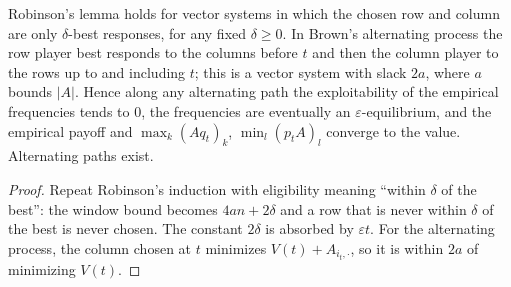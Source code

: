 \begin{theorem}
\label{thm:beh-alt-fp}
\leanok
Robinson's lemma holds for vector systems in which the chosen row and column are only $\delta$-best responses, for any
fixed $\delta\ge0$. In Brown's alternating process the row player best responds to the columns before $t$ and then the
column player to the rows up to and including $t$; this is a vector system with slack $2a$, where $a$ bounds $|A|$.
Hence along any alternating path the exploitability of the empirical frequencies tends to $0$, the frequencies are
eventually an $\varepsilon$-equilibrium, and the empirical payoff and $\max_k(Aq_t)_k$, $\min_l(p_tA)_l$ converge to
the value. Alternating paths exist.
\end{theorem}
\begin{proof}
\leanok
Repeat Robinson's induction with eligibility meaning ``within $\delta$ of the best'': the window bound becomes
$4an+2\delta$ and a row that is never within $\delta$ of the best is never chosen. The constant $2\delta$ is absorbed
by $\varepsilon t$. For the alternating process, the column chosen at $t$ minimizes $V(t)+A_{i_t,\cdot}$, so it is within
$2a$ of minimizing $V(t)$.
\end{proof}

